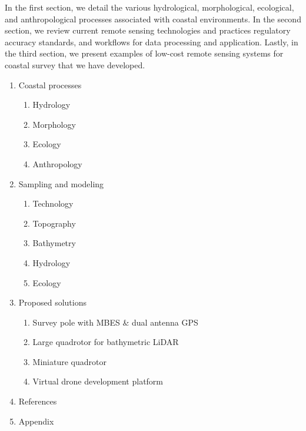 \documentclass{article}
\begin{document}
\par{In the first section, we detail the various hydrological, morphological, ecological, and anthropological processes associated with coastal environments. In the second section, we review current remote sensing technologies and practices regulatory accuracy standards, and workflows for data processing and application. Lastly, in the third section, we present examples of low-cost remote sensing systems for coastal survey that we have developed.} 

\thispagestyle{fancy}

\newpage
{}
\thispagestyle{fancy}
\begin{enumerate}
    \item{Coastal processes}
    \begin{enumerate}
        \item{Hydrology}
        \item{Morphology}
        \item{Ecology}
        \item{Anthropology}
    \end{enumerate}

    \item{Sampling and modeling}
    \begin{enumerate}
        \item{Technology}
        \item{Topography}
        \item{Bathymetry}
        \item{Hydrology}
        \item{Ecology}
    \end{enumerate}

    \item Proposed solutions
    \begin{enumerate}
        \item{Survey pole with MBES \& dual antenna GPS}
        \item{Large quadrotor for bathymetric LiDAR}
        \item{Miniature quadrotor}
        \item{Virtual drone development platform}
    \end{enumerate}

    \item{References}
    \item{Appendix}
\end{enumerate}
\end{document}
